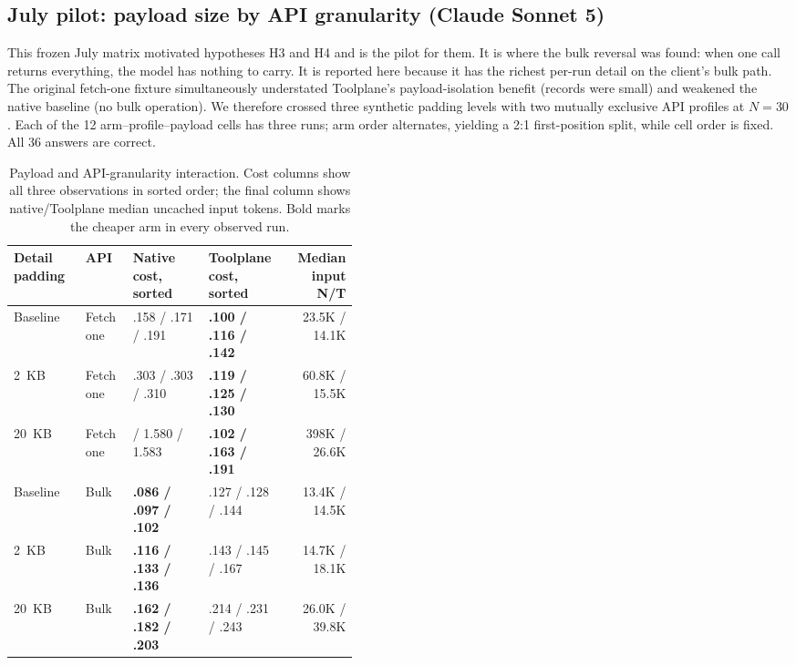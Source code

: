\documentclass[10pt,twocolumn]{article}
\begin{document}
\subsection{July pilot: payload size by API granularity (Claude Sonnet 5)}
\label{sec:payload-pilot}

This frozen July matrix motivated hypotheses H3 and H4 and is the pilot for
them.  It is where the bulk reversal was found: when one call returns
everything, the model has nothing to carry.  It is reported here because it has the richest per-run detail on the
client's bulk path.  The original fetch-one fixture simultaneously understated Toolplane's
payload-isolation benefit (records were small) and weakened the native
baseline (no bulk operation).  We therefore crossed three synthetic padding
levels with two mutually exclusive API profiles at $N=30$.  Each of the 12
arm--profile--payload cells has three runs; arm order alternates, yielding a
2:1 first-position split, while cell order is fixed.  All 36 answers are
correct.

\begin{table}[t]
\centering
\scriptsize
\caption{Payload and API-granularity interaction.  Cost columns show all three
observations in sorted order; the final column shows native/Toolplane median
uncached input tokens.  Bold marks the cheaper arm in every observed run.}
\label{tab:payload}
\begin{tabular}{ll>{\raggedright\arraybackslash}p{0.22\linewidth}>{\raggedright\arraybackslash}p{0.22\linewidth}r}
\toprule
Detail padding & API & Native cost, sorted & Toolplane cost, sorted & Median input N/T \\
\midrule
Baseline & Fetch one & .158 / .171 / .191 & \textbf{.100 / .116 / .142} & 23.5K / 14.1K \\
2~KB & Fetch one & .303 / .303 / .310 & \textbf{.119 / .125 / .130} & 60.8K / 15.5K \\
20~KB & Fetch one & 1.574 / 1.580 / 1.583 & \textbf{.102 / .163 / .191} & 398K / 26.6K \\
\midrule
Baseline & Bulk & \textbf{.086 / .097 / .102} & .127 / .128 / .144 & 13.4K / 14.5K \\
2~KB & Bulk & \textbf{.116 / .133 / .136} & .143 / .145 / .167 & 14.7K / 18.1K \\
20~KB & Bulk & \textbf{.162 / .182 / .203} & .214 / .231 / .243 & 26.0K / 39.8K \\
\bottomrule
\end{tabular}
\end{table}
\end{document}
